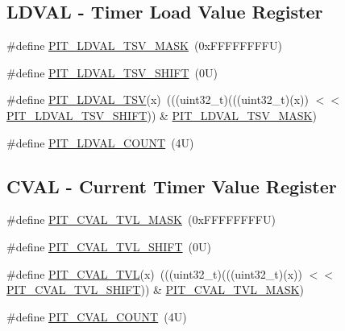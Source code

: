 \subsection*{L\+D\+V\+AL -\/ Timer Load Value Register}
\begin{DoxyCompactItemize}
\item 
\#define \mbox{\hyperlink{group___p_i_t___register___masks_gab7929b3b8a0c170a50f57d97face5365}{P\+I\+T\+\_\+\+L\+D\+V\+A\+L\+\_\+\+T\+S\+V\+\_\+\+M\+A\+SK}}~(0x\+F\+F\+F\+F\+F\+F\+F\+F\+U)
\item 
\#define \mbox{\hyperlink{group___p_i_t___register___masks_ga463855d2b42de901bad9bea868f4f48b}{P\+I\+T\+\_\+\+L\+D\+V\+A\+L\+\_\+\+T\+S\+V\+\_\+\+S\+H\+I\+FT}}~(0\+U)
\item 
\#define \mbox{\hyperlink{group___p_i_t___register___masks_ga1aa1b498b2c8f1a14d095370a7ddf9a6}{P\+I\+T\+\_\+\+L\+D\+V\+A\+L\+\_\+\+T\+SV}}(x)~(((uint32\+\_\+t)(((uint32\+\_\+t)(x)) $<$$<$ \mbox{\hyperlink{group___p_i_t___register___masks_ga463855d2b42de901bad9bea868f4f48b}{P\+I\+T\+\_\+\+L\+D\+V\+A\+L\+\_\+\+T\+S\+V\+\_\+\+S\+H\+I\+FT}})) \& \mbox{\hyperlink{group___p_i_t___register___masks_gab7929b3b8a0c170a50f57d97face5365}{P\+I\+T\+\_\+\+L\+D\+V\+A\+L\+\_\+\+T\+S\+V\+\_\+\+M\+A\+SK}})
\item 
\#define \mbox{\hyperlink{group___p_i_t___register___masks_ga3d2d70f366f2b214ae060c0cb0abb202}{P\+I\+T\+\_\+\+L\+D\+V\+A\+L\+\_\+\+C\+O\+U\+NT}}~(4\+U)
\end{DoxyCompactItemize}
\subsection*{C\+V\+AL -\/ Current Timer Value Register}
\begin{DoxyCompactItemize}
\item 
\#define \mbox{\hyperlink{group___p_i_t___register___masks_ga2810b877338372cb9b9d944b206c08d3}{P\+I\+T\+\_\+\+C\+V\+A\+L\+\_\+\+T\+V\+L\+\_\+\+M\+A\+SK}}~(0x\+F\+F\+F\+F\+F\+F\+F\+F\+U)
\item 
\#define \mbox{\hyperlink{group___p_i_t___register___masks_ga28753a1a45034ccd34e052faa3e02ff0}{P\+I\+T\+\_\+\+C\+V\+A\+L\+\_\+\+T\+V\+L\+\_\+\+S\+H\+I\+FT}}~(0\+U)
\item 
\#define \mbox{\hyperlink{group___p_i_t___register___masks_ga00291ae8d045c0b0f199d8950c7e453a}{P\+I\+T\+\_\+\+C\+V\+A\+L\+\_\+\+T\+VL}}(x)~(((uint32\+\_\+t)(((uint32\+\_\+t)(x)) $<$$<$ \mbox{\hyperlink{group___p_i_t___register___masks_ga28753a1a45034ccd34e052faa3e02ff0}{P\+I\+T\+\_\+\+C\+V\+A\+L\+\_\+\+T\+V\+L\+\_\+\+S\+H\+I\+FT}})) \& \mbox{\hyperlink{group___p_i_t___register___masks_ga2810b877338372cb9b9d944b206c08d3}{P\+I\+T\+\_\+\+C\+V\+A\+L\+\_\+\+T\+V\+L\+\_\+\+M\+A\+SK}})
\item 
\#define \mbox{\hyperlink{group___p_i_t___register___masks_ga8620fe2fb28dc11a864333f6ef51b9bd}{P\+I\+T\+\_\+\+C\+V\+A\+L\+\_\+\+C\+O\+U\+NT}}~(4\+U)
\end{DoxyCompactItemize}
